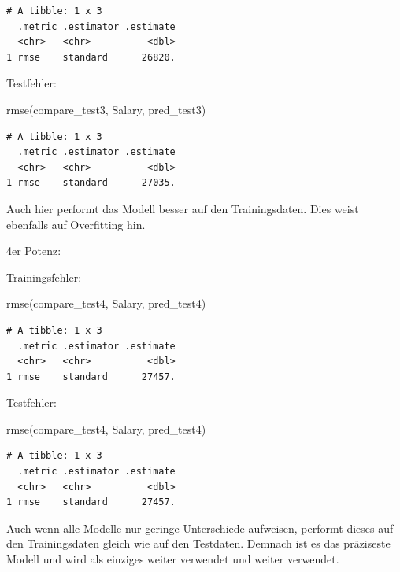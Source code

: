\documentclass[
  letterpaper,
  DIV=11,
  numbers=noendperiod]{scrartcl}
\newenvironment{Shaded}{\begin{snugshade}}{\end{snugshade}}
\newcommand{\FunctionTok}[1]{\textcolor[rgb]{0.28,0.35,0.67}{#1}}
\newcommand{\NormalTok}[1]{\textcolor[rgb]{0.00,0.23,0.31}{#1}}
\begin{document}
\begin{verbatim}
# A tibble: 1 x 3
  .metric .estimator .estimate
  <chr>   <chr>          <dbl>
1 rmse    standard      26820.
\end{verbatim}

Testfehler:

\begin{Shaded}
\begin{Highlighting}[]
\FunctionTok{rmse}\NormalTok{(compare\_test3, Salary, pred\_test3)}
\end{Highlighting}
\end{Shaded}

\begin{verbatim}
# A tibble: 1 x 3
  .metric .estimator .estimate
  <chr>   <chr>          <dbl>
1 rmse    standard      27035.
\end{verbatim}

Auch hier performt das Modell besser auf den Trainingsdaten. Dies weist
ebenfalls auf Overfitting hin.

4er Potenz:

Trainingsfehler:

\begin{Shaded}
\begin{Highlighting}[]
\FunctionTok{rmse}\NormalTok{(compare\_test4, Salary, pred\_test4)}
\end{Highlighting}
\end{Shaded}

\begin{verbatim}
# A tibble: 1 x 3
  .metric .estimator .estimate
  <chr>   <chr>          <dbl>
1 rmse    standard      27457.
\end{verbatim}

Testfehler:

\begin{Shaded}
\begin{Highlighting}[]
\FunctionTok{rmse}\NormalTok{(compare\_test4, Salary, pred\_test4)}
\end{Highlighting}
\end{Shaded}

\begin{verbatim}
# A tibble: 1 x 3
  .metric .estimator .estimate
  <chr>   <chr>          <dbl>
1 rmse    standard      27457.
\end{verbatim}

Auch wenn alle Modelle nur geringe Unterschiede aufweisen, performt
dieses auf den Trainingsdaten gleich wie auf den Testdaten. Demnach ist
es das präziseste Modell und wird als einziges weiter verwendet und
weiter verwendet.
\end{document}

